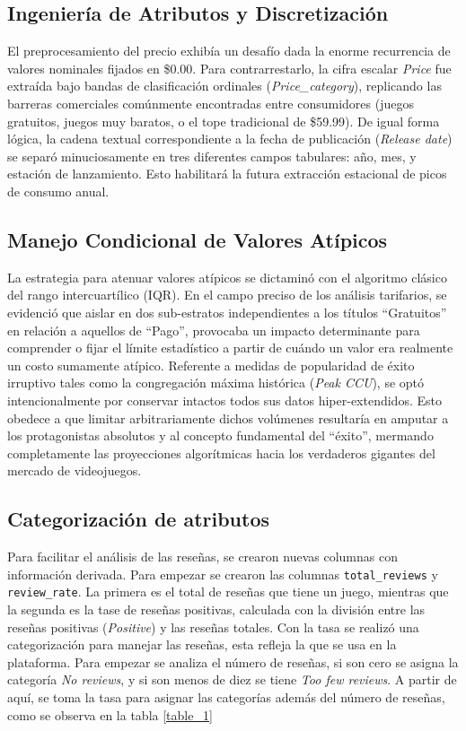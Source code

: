 \documentclass[conference]{IEEEtran}
\begin{document}
\subsection{Ingeniería de Atributos y Discretización}
El preprocesamiento del precio exhibía un desafío dada la enorme recurrencia de valores nominales fijados en \$0.00. Para contrarrestarlo, la cifra escalar \textit{Price} fue extraída bajo bandas de clasificación ordinales (\textit{Price\_category}), replicando las barreras comerciales comúnmente encontradas entre consumidores (juegos gratuitos, juegos muy baratos, o el tope tradicional de \$59.99). De igual forma lógica, la cadena textual correspondiente a la fecha de publicación (\textit{Release date}) se separó minuciosamente en tres diferentes campos tabulares: año, mes, y estación de lanzamiento. Esto habilitará la futura extracción estacional de picos de consumo anual.

\subsection{Manejo Condicional de Valores Atípicos}
La estrategia para atenuar valores atípicos se dictaminó con el algoritmo clásico del rango intercuartílico (IQR). En el campo preciso de los análisis tarifarios, se evidenció que aislar en dos sub-estratos independientes a los títulos ``Gratuitos'' en relación a aquellos de ``Pago'', provocaba un impacto determinante para comprender o fijar el límite estadístico a partir de cuándo un valor era realmente un costo sumamente atípico. Referente a medidas de popularidad de éxito irruptivo tales como la congregación máxima histórica (\textit{Peak CCU}), se optó intencionalmente por conservar intactos todos sus datos hiper-extendidos. Esto obedece a que limitar arbitrariamente dichos volúmenes resultaría en amputar a los protagonistas absolutos y al concepto fundamental del ``éxito'', mermando completamente las proyecciones algorítmicas hacia los verdaderos gigantes del mercado de videojuegos.

\subsection{Categorización de atributos}
Para facilitar el análisis de las reseñas, se crearon nuevas columnas con información derivada. Para empezar se crearon las columnas \texttt{total\_reviews} y \texttt{review\_rate}. La primera es el total de reseñas que tiene un juego, mientras que la segunda es la tase de reseñas positivas, calculada con la división entre las reseñas positivas (\textit{Positive}) y las reseñas totales. Con la tasa se realizó una categorización para manejar las reseñas, esta refleja la que se usa en la plataforma. Para empezar se analiza el número de reseñas, si son cero se asigna la categoría \textit{No reviews}, y si son menos de diez se tiene \textit{Too few reviews}. A partir de aquí, se toma la tasa para asignar las categorías además del número de reseñas, como se observa en la tabla \ref{table_1}
\end{document}
